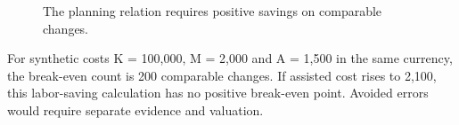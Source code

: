 \begin{figure}[H]
\centering
{}
\caption{The planning relation requires positive savings on comparable changes.}\label{fig:teach-P-04-prototype-06}
\end{figure}

For synthetic costs K = 100,000, M = 2,000 and A = 1,500 in the same currency, the break-even count is 200 comparable changes. If assisted cost rises to 2,100, this labor-saving calculation has no positive break-even point. Avoided errors would require separate evidence and valuation.

